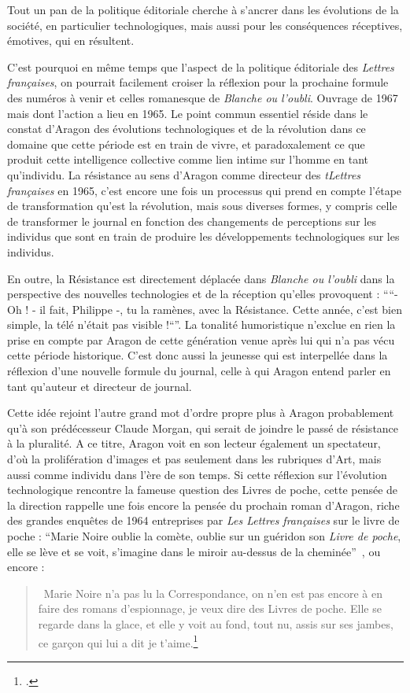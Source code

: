 	Tout un pan de la politique éditoriale cherche à s’ancrer dans les évolutions de la société, en particulier technologiques, mais aussi pour les conséquences réceptives, émotives, qui en résultent.

	C’est pourquoi en même temps que l’aspect de la politique éditoriale des \emph{Lettres françaises}, on pourrait facilement croiser la réflexion pour la prochaine formule des numéros à venir et celles romanesque de \emph{Blanche ou l’oubli}. Ouvrage de 1967 mais dont l’action a lieu en 1965. Le point commun essentiel réside dans le constat d’Aragon des évolutions technologiques et de la révolution dans ce domaine que cette période est en train de vivre, et paradoxalement ce que produit cette intelligence collective comme lien intime sur l’homme en tant qu’individu. La résistance au sens d’Aragon comme directeur des \emph{tLettres françaises} en 1965, c’est encore une fois un processus qui prend en compte l’étape de transformation qu’est la révolution, mais sous diverses formes, y compris celle de transformer le journal en fonction des changements de perceptions sur les individus que sont en train de produire les développements technologiques sur les individus.

	 En outre, la Résistance est directement déplacée dans \emph{Blanche ou l’oubli} dans la perspective des nouvelles technologies et de la réception qu’elles provoquent : \enquote{“- Oh ! - il fait, Philippe -, tu la ramènes, avec la Résistance. Cette année, c’est bien simple, la télé n’était pas visible !“}. La tonalité humoristique n’exclue en rien la prise en compte par Aragon de cette génération venue après lui qui n’a pas vécu cette période historique. C’est donc aussi la jeunesse qui est interpellée dans la réflexion d’une nouvelle formule du journal, celle à qui Aragon entend parler en tant qu’auteur et directeur de journal. 

	Cette idée rejoint l’autre grand mot d’ordre propre plus à Aragon probablement qu’à son prédécesseur Claude Morgan, qui serait de joindre le passé de résistance à la pluralité. A ce titre, Aragon voit en son lecteur également un spectateur, d’où la prolifération d’images et pas seulement dans les rubriques d’Art, mais aussi comme individu dans l’ère de son temps. Si cette réflexion sur l’évolution technologique rencontre la fameuse question des Livres de poche, cette pensée de la direction rappelle une fois encore la pensée du prochain roman d’Aragon, riche des grandes enquêtes de 1964 entreprises par \emph{Les Lettres françaises} sur le livre de poche : \enquote{Marie Noire oublie la comète, oublie sur un guéridon son \emph{Livre de poche}, elle se lève et se voit, s’imagine dans le miroir au-dessus de la cheminée} , ou encore :
	\begin{quote}
	 Marie Noire n’a pas lu la Correspondance, on n’en est pas encore à en faire des romans d’espionnage, je veux dire des Livres de poche. Elle se regarde dans la glace, et elle y voit au fond, tout nu, assis sur ses jambes, ce garçon qui lui a dit je t’aime.\footcite[p102]{blancheouloubli}\end{quote}

